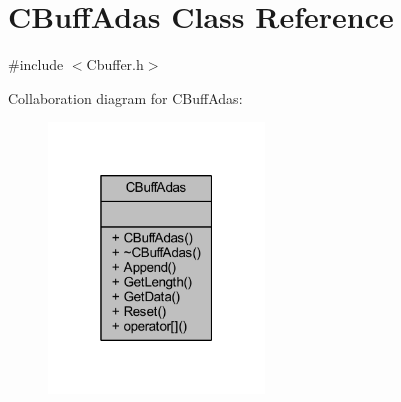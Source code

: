\hypertarget{class_c_buff_adas}{}\section{C\+Buff\+Adas Class Reference}
\label{class_c_buff_adas}


{\ttfamily \#include $<$Cbuffer.\+h$>$}



Collaboration diagram for C\+Buff\+Adas\+:\nopagebreak
\begin{figure}[H]
\begin{center}
\leavevmode
\includegraphics[width=163pt]{class_c_buff_adas__coll__graph}
\end{center}
\end{figure}
